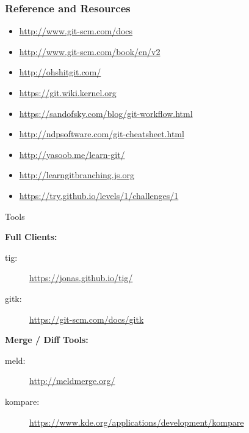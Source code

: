 \begin{frame}
    \frametitle{Reference and Resources}
    \begin{itemize}
        \item \url{http://www.git-scm.com/docs} %
        \item \url{http://www.git-scm.com/book/en/v2} %
        \item \url{http://ohshitgit.com/} %
        \item \url{https://git.wiki.kernel.org} %
        \item \url{https://sandofsky.com/blog/git-workflow.html} %
        \item \url{http://ndpsoftware.com/git-cheatsheet.html} %
        \item \url{http://yasoob.me/learn-git/} %
        \item \url{http://learngitbranching.js.org} %
        \item \url{https://try.github.io/levels/1/challenges/1} %
    \end{itemize}
\end{frame}


\begin{frame}{Tools}

    \textbf{Full Clients:}
    \begin{description}
        \item[tig:] \url{https://jonas.github.io/tig/}
        \item[gitk:] \url{https://git-scm.com/docs/gitk}
    \end{description}

    \textbf{Merge / Diff Tools:}
    \begin{description}
        \item[meld:] \url{http://meldmerge.org/}
        \item[kompare:] \url{https://www.kde.org/applications/development/kompare}
    \end{description}

\end{frame}
